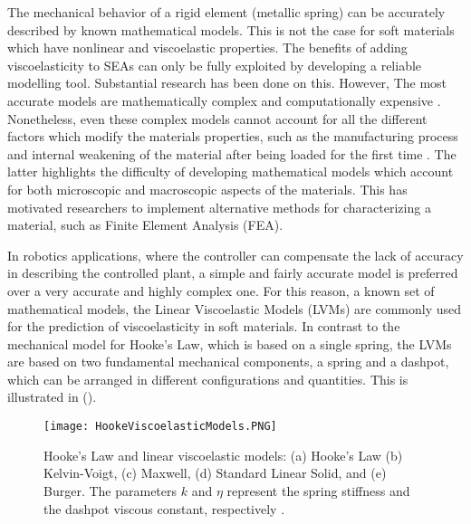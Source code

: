 The mechanical behavior of a rigid element (metallic spring) can be accurately described by known mathematical models. This is not the case for soft materials which have nonlinear and viscoelastic properties. The benefits of adding viscoelasticity to SEAs can only be fully exploited by developing a  reliable modelling tool. Substantial research has been done on this. However, The most accurate models are mathematically complex and computationally expensive \cite{xu2014mathematical,ciniello2017identifying,lu2017constitutive}. Nonetheless, even these complex models cannot account for all the different  factors which modify the materials properties, such as the manufacturing process and internal weakening of the material after being loaded for the first time \cite{case2015soft}. The latter highlights the difficulty of developing mathematical models which account for both microscopic and macroscopic aspects of the materials. This has motivated researchers to implement alternative methods for characterizing a material, such as Finite Element Analysis (FEA).

In robotics applications, where the controller can compensate the lack of accuracy in describing the controlled plant, a simple and fairly accurate model is preferred over a very accurate and highly complex one. For this reason, a known set of mathematical models, the Linear Viscoelastic Models (LVMs) are commonly used for the prediction of viscoelasticity in soft materials. In contrast to the mechanical model for Hooke's Law, which is based on a single spring, the LVMs are based on two fundamental mechanical components, a spring and a dashpot, which can be arranged in different configurations and quantities. This is illustrated in ().

\begin{figure}[hbt!]
	\centering
    \texttt{[image: HookeViscoelasticModels.PNG]}
    \caption{Hooke's Law and linear viscoelastic models: (a) Hooke's Law (b) Kelvin-Voigt, (c) Maxwell, (d) Standard Linear Solid, and (e) Burger. The parameters $k$ and $\eta$ represent the spring stiffness and the dashpot viscous constant, respectively \cite{austin2015control}. }
    \label{fig:LinearViscoelasticModels}
\end{figure}

